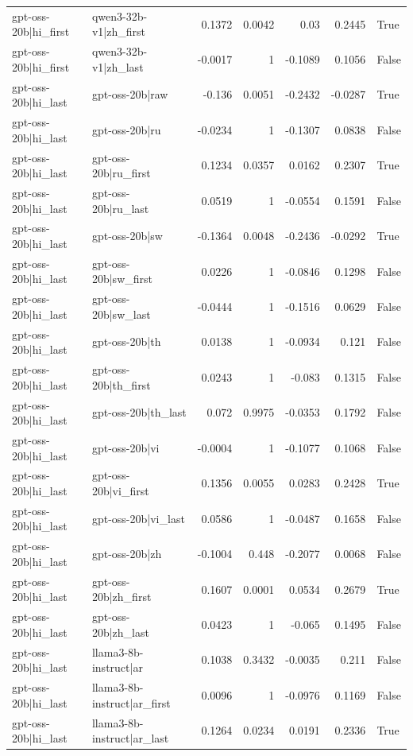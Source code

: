 \begin{table}
\begin{tabular}{l l r r r r l}
gpt-oss-20b|hi_first & qwen3-32b-v1|zh_first & 0.1372 & 0.0042 & 0.03 & 0.2445 & True \\
gpt-oss-20b|hi_first & qwen3-32b-v1|zh_last & -0.0017 & 1 & -0.1089 & 0.1056 & False \\
gpt-oss-20b|hi_last & gpt-oss-20b|raw & -0.136 & 0.0051 & -0.2432 & -0.0287 & True \\
gpt-oss-20b|hi_last & gpt-oss-20b|ru & -0.0234 & 1 & -0.1307 & 0.0838 & False \\
gpt-oss-20b|hi_last & gpt-oss-20b|ru_first & 0.1234 & 0.0357 & 0.0162 & 0.2307 & True \\
gpt-oss-20b|hi_last & gpt-oss-20b|ru_last & 0.0519 & 1 & -0.0554 & 0.1591 & False \\
gpt-oss-20b|hi_last & gpt-oss-20b|sw & -0.1364 & 0.0048 & -0.2436 & -0.0292 & True \\
gpt-oss-20b|hi_last & gpt-oss-20b|sw_first & 0.0226 & 1 & -0.0846 & 0.1298 & False \\
gpt-oss-20b|hi_last & gpt-oss-20b|sw_last & -0.0444 & 1 & -0.1516 & 0.0629 & False \\
gpt-oss-20b|hi_last & gpt-oss-20b|th & 0.0138 & 1 & -0.0934 & 0.121 & False \\
gpt-oss-20b|hi_last & gpt-oss-20b|th_first & 0.0243 & 1 & -0.083 & 0.1315 & False \\
gpt-oss-20b|hi_last & gpt-oss-20b|th_last & 0.072 & 0.9975 & -0.0353 & 0.1792 & False \\
gpt-oss-20b|hi_last & gpt-oss-20b|vi & -0.0004 & 1 & -0.1077 & 0.1068 & False \\
gpt-oss-20b|hi_last & gpt-oss-20b|vi_first & 0.1356 & 0.0055 & 0.0283 & 0.2428 & True \\
gpt-oss-20b|hi_last & gpt-oss-20b|vi_last & 0.0586 & 1 & -0.0487 & 0.1658 & False \\
gpt-oss-20b|hi_last & gpt-oss-20b|zh & -0.1004 & 0.448 & -0.2077 & 0.0068 & False \\
gpt-oss-20b|hi_last & gpt-oss-20b|zh_first & 0.1607 & 0.0001 & 0.0534 & 0.2679 & True \\
gpt-oss-20b|hi_last & gpt-oss-20b|zh_last & 0.0423 & 1 & -0.065 & 0.1495 & False \\
gpt-oss-20b|hi_last & llama3-8b-instruct|ar & 0.1038 & 0.3432 & -0.0035 & 0.211 & False \\
gpt-oss-20b|hi_last & llama3-8b-instruct|ar_first & 0.0096 & 1 & -0.0976 & 0.1169 & False \\
gpt-oss-20b|hi_last & llama3-8b-instruct|ar_last & 0.1264 & 0.0234 & 0.0191 & 0.2336 & True \\

\end{tabular}
\end{table}
